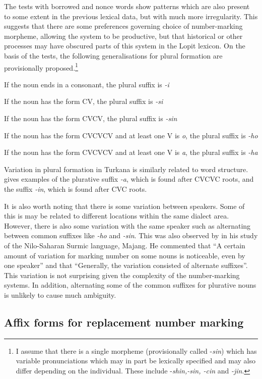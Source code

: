 \documentclass[output=paper]{langsci/langscibook}
\begin{document}
The tests with borrowed and nonce words show patterns which are also present to some extent in the previous lexical data, but with much more irregularity. This suggests that there are some preferences governing choice of number-marking morpheme, allowing the system to be productive, but that historical or other processes may have obscured parts of this system in the Lopit lexicon. On the basis of the tests, the following generalisations for plural formation are provisionally proposed.\footnote{I assume that there is a single morpheme (provisionally called -\textit{sin}) which has variable pronunciations which may in part be lexically specified and may also differ depending on the individual. These include -\textit{shin,-sin, -cin }and \textit{-jin}.}

\ea\label{ex:moodie:3} If the noun ends in a consonant, the plural suffix is \textit{-i}

If the noun has the form CV, the plural suffix is \textit{-si} 

If the noun has the form CVCV, the plural suffix is \textit{-sin} 

If the noun has the form CVCVCV and at least one V is\textit{ o}, the plural suffix is \textit{-ho} 

If the noun has the form CVCVCV and at least one V is \textit{a}, the plural suffix is \textit{-ha} 
\z

Variation in plural formation in Turkana is similarly related to word structure. \citet[235]{Dimmendaal2000} gives examples of the plurative suffix \textit{-a}, which is found after CVCVC roots, and the suffix \textit{-in}, which is found after CVC roots. 

It is also worth noting that there is some variation between speakers. Some of this is may be related to different locations within the same dialect area. However, there is also some variation with the same speaker such as alternating between common suffixes like \textit{-ho} and \textit{-sin}. This was also observed by \citet[76]{Unseth1988} in his study of the Nilo-Saharan Surmic language, Majang. He commented that “A certain amount of variation for marking number on some nouns is noticeable, even by one speaker” and that “Generally, the variation consisted of alternate suffixes”. This variation is not surprising given the complexity of the number-marking systems. In addition, alternating some of the common suffixes for plurative nouns is unlikely to cause much ambiguity.

\subsection{Affix forms for replacement number marking} \label{sec:moodie:4.3}
\end{document}

